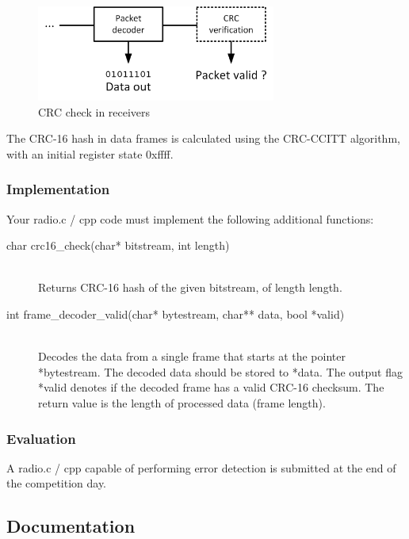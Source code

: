\documentclass[openany]{book}
\begin{document}
	\begin{figure}[h!]
		\centering
		\includegraphics[width=0.7\textwidth]{Images/Task3.png}
		\caption{CRC check in receivers}
		\label{fig:task3}
	\end{figure}
	
	The CRC-16 hash in data frames is calculated using the CRC-CCITT algorithm, 
	with an initial register state \textsf{0xffff}.
	
	\subsubsection{Implementation}
	Your \textsf{radio.c / cpp} code must implement the following additional 
	functions:
	\begin{description}
		\item[char crc16\_check(char* bitstream, int length)] \leavevmode
		\,\\ Returns CRC-16 hash of the given \textsf{bitstream}, of length 
		\textsf{length}.
		\item[int frame\_decoder\_valid(char* bytestream, char** data, bool 
		*valid)] \leavevmode
		\,\\ Decodes the data from a single frame that starts at the pointer 
		\textsf{*bytestream}. The decoded data should be stored to 
		\textsf{*data}. The output flag \textsf{*valid} denotes if the decoded 
		frame has a valid CRC-16 checksum. The return value is the length of 
		processed data (frame length).
	\end{description}
	
	\subsubsection{Evaluation}
	
	A \textsf{radio.c / cpp} capable of performing error detection is submitted 
	at the end of the competition day.
	
	\subsection{Documentation}
	
\end{document}
